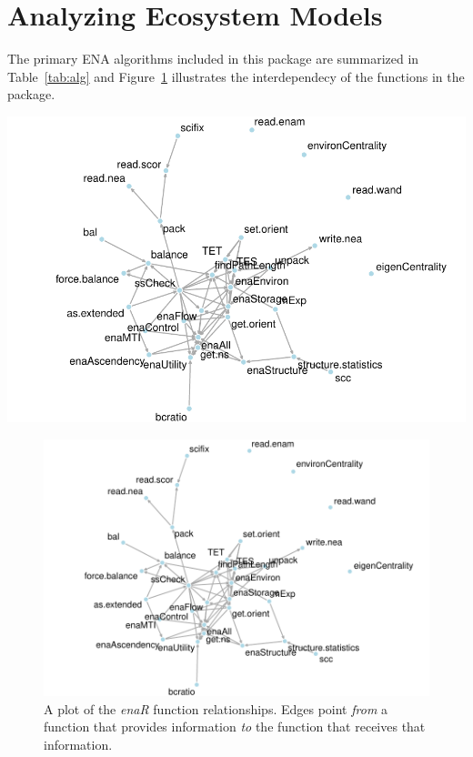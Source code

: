 \documentclass[article]{jss}
\begin{document}

\section{Analyzing Ecosystem Models}

The primary ENA algorithms included in this package are summarized in
Table~\ref{tab:alg} and Figure~\ref{fig:depnet} illustrates the
interdependecy of the functions in the package.

\includegraphics[]{enaR-vignette-003}

\begin{figure}
  \center
  \includegraphics[]{enaR-vignette-003}
  \caption{A plot of the \textit{enaR} function relationships. Edges
    point \textit{from} a function that provides information \textit{to}
    the function that receives that information.} \label{fig:depnet}
\end{figure}
\end{document}
